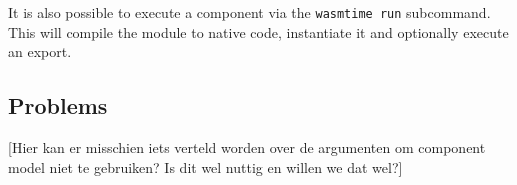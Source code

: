 It is also possible to execute a component via the \texttt{wasmtime run} subcommand. This will compile the module to native code, instantiate it and optionally execute an export.


\subsection{Problems}

[Hier kan er misschien iets verteld worden over de argumenten om component model niet te gebruiken? Is dit wel nuttig en willen we dat wel?]
